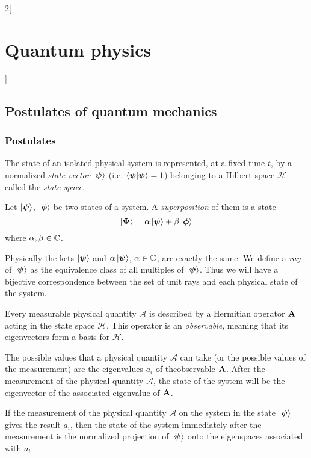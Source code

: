 \documentclass[../../../main.tex]{subfiles}
\begin{document}
\begin{multicols}{2}[\section{Quantum physics}]
  \subsection{Postulates of quantum mechanics}
  \subsubsection{Postulates}
  \begin{definition}[Postulate I]
    The state of an isolated physical system is represented, at a fixed time $t$, by a normalized \emph{state vector} $\ket{\boldsymbol{\mathrm{\psi}}}$ (i.e. $\braket{\boldsymbol{\mathrm{\psi}}}{\boldsymbol{\mathrm{\psi}}}=1$) belonging to a Hilbert space $\mathcal{H}$ called the \emph{state space}.
  \end{definition}
  \begin{definition}
    Let $\ket{\boldsymbol{\mathrm{\psi}}}$, $\ket{\boldsymbol{\mathrm{\phi}}}$ be two states of a system. A \emph{superposition} of them is a state $$\ket{\boldsymbol{\mathrm{\Psi}}}=\alpha\ket{\boldsymbol{\mathrm{\psi}}}+\beta\ket{\boldsymbol{\mathrm{\phi}}}$$ where $\alpha,\beta\in\mathbb{C}$.
  \end{definition}
  \begin{definition}
    Physically the kets $\ket{\boldsymbol{\mathrm{\psi}}}$ and $\alpha\ket{\boldsymbol{\mathrm{\psi}}}$, $\alpha\in\mathbb{C}$, are exactly the same. We define a \emph{ray} of $\ket{\boldsymbol{\mathrm{\psi}}}$ as the equivalence class of all multiples of $\ket{\boldsymbol{\mathrm{\psi}}}$. Thus we will have a bijective correspondence between the set of unit rays and each physical state of the system.
  \end{definition}
  \begin{definition}[Postulate II]
    Every measurable physical quantity $\mathcal{A}$ is described by a Hermitian operator $\boldsymbol{\mathrm{A}}$ acting in the state space $\mathcal{H}$. This operator is an \emph{observable}, meaning that its eigenvectors form a basis for $\mathcal{H}$.
  \end{definition}
  \begin{definition}
    The possible values that a physical quantity $\mathcal{A}$ can take (or the possible values of the measurement) are the eigenvalues $a_i$ of theobservable $\boldsymbol{\mathrm{A}}$. After the measurement of the physical quantity $\mathcal{A}$, the state of the system will be the eigenvector of the associated eigenvalue of $\boldsymbol{\mathrm{A}}$.
  \end{definition}
  \begin{definition}
    If the measurement of the physical quantity $\mathcal{A}$ on the system in the state $\ket{\boldsymbol{\mathrm{\psi}}}$ gives the result $a_i$, then the state of the system immediately after the measurement is the normalized projection of $\ket{\boldsymbol{\mathrm{\psi}}}$ onto the eigenspaces associated with $a_i$:

\end{definition}
\end{multicols}
\end{document}
